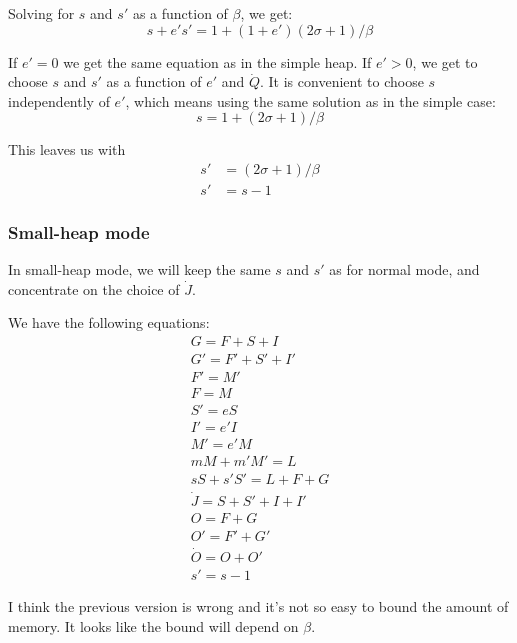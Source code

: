 \documentclass{article}
\begin{document}
Solving for $s$ and $s'$ as a function of $\beta$, we get:
\begin{equation} \label{eqn-s'}
s + e' s' = 1 + (1+e') (2\sigma+1)/\beta
\end{equation}

If $e' = 0$ we get the same equation as in the simple heap. If $e' >
0$, we get to choose $s$ and $s'$ as a function of $e'$ and
$\dot{Q}$. It is convenient to choose $s$ independently of $e'$,
which means using the same solution as in the simple case:
\begin{equation} \label{solution-s'}
s = 1 + (2\sigma+1)/\beta
\end{equation}

This leaves us with
\begin{align}
s' & = (2\sigma+1)/\beta \\
s' & = s - 1
\end{align}


\subsubsection{Small-heap mode}

In small-heap mode, we will keep the same $s$ and $s'$ as for normal
mode, and concentrate on the choice of $\dot{J}$.

We have the following equations:
\begin{gather*}
G = F + S + I  \\
G' = F' + S' + I'  \\
F' = M'  \\
F = M \\
S' = eS \\
I' = e'I \\
M' = e'M \\
mM + m'M' = L \\
sS + s'S' = L + F + G \\
\dot{J} = S + S' + I + I'  \\
O = F + G  \\
O' = F' + G' \\
\dot{O} = O + O'  \\
s' = s - 1
\end{gather*}

I think the previous version is wrong and it's not so easy to bound
the amount of memory. It looks like the bound will depend on $\beta$.

\end{document}
